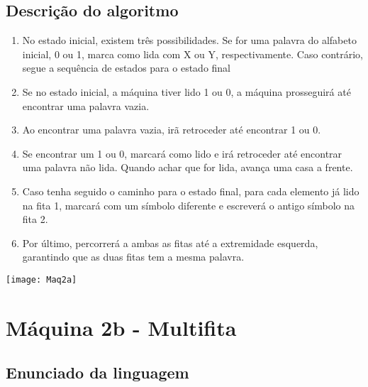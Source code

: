 \documentclass{article}
\begin{document}
    \subsection{Descrição do algoritmo}
        \begin{enumerate}
        \item No estado inicial, existem três possibilidades. Se for uma 
        palavra do alfabeto inicial, 0 ou 1, marca como lida com X ou Y, 
        respectivamente. Caso contrário, segue a sequência de estados para
        o estado final
        \item Se no estado inicial, a máquina tiver lido 1 ou 0, a máquina
        prosseguirá até encontrar uma palavra vazia.
        \item Ao encontrar uma palavra vazia, irã retroceder até encontrar 1 ou 0.
        \item Se encontrar um 1 ou 0, marcará como lido e irá retroceder até
        encontrar uma palavra não lida. Quando achar que for lida, avança
        uma casa a frente.
        \item Caso tenha seguido o caminho para o estado final, para 
        cada elemento já lido na fita 1, marcará com um símbolo diferente 
        e escreverá o antigo símbolo na fita 2.
        \item Por último, percorrerá a ambas as fitas até a extremidade 
        esquerda, garantindo que as duas fitas tem a mesma palavra.
        \end{enumerate}
        \texttt{[image: Maq2a]}
\section{Máquina 2b - Multifita}
    \subsection{Enunciado da linguagem}
\end{document}
